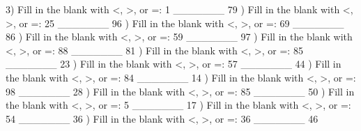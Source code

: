 \documentclass{article}%
\begin{document}
3) Fill in the blank with <, >, or =: 1 \_\_\_\_\_\_\_ 79%
\newline%
\newline%
) Fill in the blank with <, >, or =: 25 \_\_\_\_\_\_\_ 96%
\newline%
\newline%
) Fill in the blank with <, >, or =: 69 \_\_\_\_\_\_\_ 86%
\newline%
\newline%
) Fill in the blank with <, >, or =: 59 \_\_\_\_\_\_\_ 97%
\newline%
\newline%
) Fill in the blank with <, >, or =: 88 \_\_\_\_\_\_\_ 81%
\newline%
\newline%
) Fill in the blank with <, >, or =: 85 \_\_\_\_\_\_\_ 23%
\newline%
\newline%
) Fill in the blank with <, >, or =: 57 \_\_\_\_\_\_\_ 44%
\newline%
\newline%
) Fill in the blank with <, >, or =: 84 \_\_\_\_\_\_\_ 14%
\newline%
\newline%
) Fill in the blank with <, >, or =: 98 \_\_\_\_\_\_\_ 28%
\newline%
\newline%
) Fill in the blank with <, >, or =: 85 \_\_\_\_\_\_\_ 50%
\newline%
\newline%
) Fill in the blank with <, >, or =: 5 \_\_\_\_\_\_\_ 17%
\newline%
\newline%
) Fill in the blank with <, >, or =: 54 \_\_\_\_\_\_\_ 36%
\newline%
\newline%
) Fill in the blank with <, >, or =: 36 \_\_\_\_\_\_\_ 46%
\newline%
\end{document}
